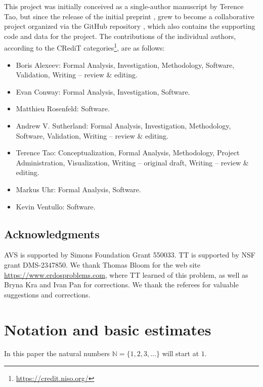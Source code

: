 \documentclass[10pt,a4paper,reqno]{amsart}
\numberwithin{equation}{section}
\theoremstyle{plain}
\theoremstyle{definition}
\newcommand\N{\mathbb{N}}
\begin{document}
This project was initially conceived as a single-author manuscript by Terence Tao, but since the release of the initial preprint \cite{tao}, grew to become a collaborative project organized via the GitHub repository \cite{github}, which also contains the supporting code and data for the project.  The contributions of the individual authors, according to the CRediT categories\footnote{\url{https://credit.niso.org/}}, are as follows:

\begin{itemize}
\item Boris Alexeev: Formal Analysis, Investigation, Methodology, Software, Validation, Writing -- review \& editing.
\item Evan Conway: Formal Analysis, Investigation, Software.
\item Matthieu Rosenfeld: Software.
\item Andrew V. Sutherland: Formal Analysis, Investigation, Methodology, Software, Validation, Writing -- review \& editing.
\item Terence Tao: Conceptualization, Formal Analysis, Methodology, Project Administration, Visualization, Writing -- original draft, Writing -- review \& editing.
\item Markus Uhr: Formal Analysis, Software.
\item Kevin Ventullo: Software.
\end{itemize}

\subsection{Acknowledgments}

AVS is supported by Simons Foundation Grant 550033.  TT is supported by NSF grant DMS-2347850.  We thank Thomas Bloom for the web site \url{https://www.erdosproblems.com}, where TT learned of this problem, as well as Bryna Kra and Ivan Pan for  corrections. We thank the referees for valuable suggestions and corrections.


\section{Notation and basic estimates}

In this paper the natural numbers $\N=\{1,2,3,\dots\}$ will start at $1$.
\end{document}
